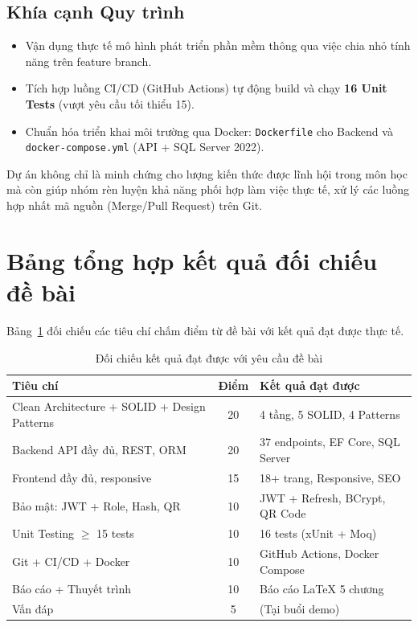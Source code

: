 \subsection{Khía cạnh Quy trình}
\begin{itemize}
    \item Vận dụng thực tế mô hình phát triển phần mềm thông qua việc chia nhỏ tính năng trên feature branch.
    \item Tích hợp luồng CI/CD (GitHub Actions) tự động build và chạy \textbf{16 Unit Tests} (vượt yêu cầu tối thiểu 15).
    \item Chuẩn hóa triển khai môi trường qua Docker: \texttt{Dockerfile} cho Backend và \texttt{docker-compose.yml} (API + SQL Server 2022).
\end{itemize}

Dự án không chỉ là minh chứng cho lượng kiến thức được lĩnh hội trong môn học mà còn giúp nhóm rèn luyện khả năng phối hợp làm việc thực tế, xử lý các luồng hợp nhất mã nguồn (Merge/Pull Request) trên Git.

\section{Bảng tổng hợp kết quả đối chiếu đề bài}
Bảng~\ref{tab:ket_qua} đối chiếu các tiêu chí chấm điểm từ đề bài với kết quả đạt được thực tế.

\begin{table}[htbp]
    \centering
    \caption{Đối chiếu kết quả đạt được với yêu cầu đề bài}
    \label{tab:ket_qua}
    \begin{tabular}{|p{7cm}|c|p{4.5cm}|}
        \hline
        \textbf{Tiêu chí} & \textbf{Điểm} & \textbf{Kết quả đạt được} \\
        \hline
        Clean Architecture + SOLID + Design Patterns & 20 & 4 tầng, 5 SOLID, 4 Patterns \\
        \hline
        Backend API đầy đủ, REST, ORM & 20 & 37 endpoints, EF Core, SQL Server \\
        \hline
        Frontend đầy đủ, responsive & 15 & 18+ trang, Responsive, SEO \\
        \hline
        Bảo mật: JWT + Role, Hash, QR & 10 & JWT + Refresh, BCrypt, QR Code \\
        \hline
        Unit Testing $\geq$ 15 tests & 10 & 16 tests (xUnit + Moq) \\
        \hline
        Git + CI/CD + Docker & 10 & GitHub Actions, Docker Compose \\
        \hline
        Báo cáo + Thuyết trình & 10 & Báo cáo LaTeX 5 chương \\
        \hline
        Vấn đáp & 5 & (Tại buổi demo) \\
        \hline
    \end{tabular}
\end{table}

